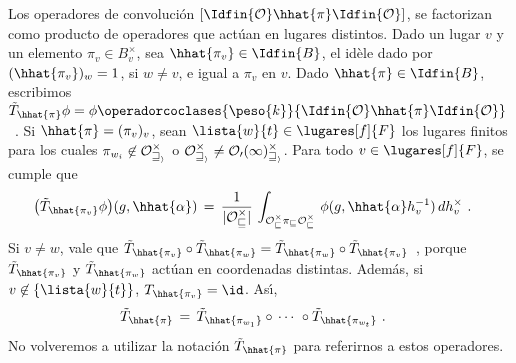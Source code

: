 Los operadores de convoluci\'{o}n $[\Idfin{\cal{O}}\hhat{\pi}\Idfin{\cal{O}}]$,
se factorizan como producto de operadores que act\'{u}an en lugares distintos.
Dado un lugar $v$ y un elemento $\pi_{v}\in B_{v}^{\times}$, sea
$\hhat{\pi_{v}}\in\Idfin{B}$, el id\`{e}le dado por $(\hhat{\pi_{v}})_{w}=1$,
si $w\not=v$, e igual a $\pi_{v}$ en $v$. Dado $\hhat{\pi}\in\Idfin{B}$,
escribimos
\begin{math}
	\tilde{T}_{\hhat{\pi}}\phi=\phi\operadorcoclases{\peso{k}}{%
		\Idfin{\cal{O}}\hhat{\pi}\Idfin{\cal{O}}}
\end{math}~.
Si $\hhat{\pi}=(\pi_{v})_{v}$, sean $\lista{w}{t}\in\lugares[f]{F}$ los lugares
finitos para los cuales $\pi_{w_{i}}\not\in\cal{O}_{w_{i}}^{\times}$ o
$\cal{O}_{w_{i}}^{\times}\not=\cal{O}_{0}(1)_{w_{i}}^{\times}$. Para todo
$v\in\lugares[f]{F}$, se cumple que
\begin{align*}
	\big(\tilde{T}_{\hhat{\pi_{v}}}\phi\big)(g,\hhat{\alpha}) & \,=\,
		\frac{1}{|\cal{O}_{v}^{\times}|}\,\int_{%
			\cal{O}_{v}^{\times}\pi_{v}\cal{O}_{v}^{\times}}\,
			\phi(g,\hhat{\alpha}h_{v}^{-1})\,dh_{v}^{\times}
	\text{ .}
\end{align*}
%
Si $v\not= w$, vale que
\begin{math}
	\tilde{T}_{\hhat{\pi_{v}}}\circ\tilde{T}_{\hhat{\pi_{w}}}=
		\tilde{T}_{\hhat{\pi_{w}}}\circ\tilde{T}_{\hhat{\pi_{v}}}
\end{math}~, porque $\tilde{T}_{\hhat{\pi_{v}}}$ y $\tilde{T}_{\hhat{\pi_{w}}}$
act\'{u}an en coordenadas distintas. Adem\'{a}s, si $v\not\in\{\lista{w}{t}\}$,
$T_{\hhat{\pi_{v}}}=\id$. As\'{\i},
\begin{align*}
	\tilde{T}_{\hhat{\pi}} & \,=\,\tilde{T}_{\hhat{\pi_{w_{1}}}}
		\circ\,\cdots\,\,\circ\tilde{T}_{\hhat{\pi_{w_{t}}}}
	\text{ .}
\end{align*}
%
No volveremos a utilizar la notaci\'{o}n $\tilde{T}_{\hhat{\pi}}$ para
referirnos a estos operadores.

